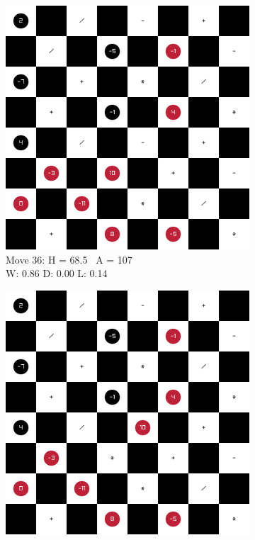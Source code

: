 \begin{figure}[H]
    \centering
    \begin{subfigure}{0.3\textwidth}
        \centering
        \includegraphics[width=\textwidth]{images/games/game3/move_37.png}
        \caption*{Move 36: H = 68.5 \textbar\ A = 107 \\ W: 0.86 D: 0.00 L: 0.14}
    \end{subfigure}
    \quad
    \begin{subfigure}{0.3\textwidth}
        \centering
        \includegraphics[width=\textwidth]{images/games/game3/move_38.png}

\end{subfigure}
\end{figure}
